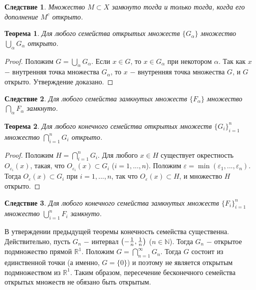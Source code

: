 \documentclass{article}
\newtheorem{theorem}{Теорема}[section]
\newtheorem*{consequence}{Следствие}
\begin{document}
\begin{consequence}
Множество \(M \subset X\) замкнуто тогда и только тогда, когда его дополнение \(M^c\) открыто.
\end{consequence}

\begin{theorem}
Для любого семейства открытых множеств \(\{G_\alpha\}\) множество \(\bigcup\limits_{\alpha}G_\alpha\) открыто.
\end{theorem}

\begin{proof}
Положим \(G = \bigcup\limits_{\alpha}G_\alpha\). Если \(x \in G\), то \(x \in G_\alpha\) при некотором \(\alpha\). Так как \(x\) \(-\) внутренняя точка множества \(G_\alpha\), то \(x\) \(-\) внутренняя точка множества \(G\), и \(G\) открыто. Утверждение доказано.
\end{proof}

\begin{consequence}
Для любого семейства замкнутых множеств \(\{F_\alpha\}\) множество \(\bigcap\limits_{\alpha}F_\alpha\) замкнуто.
\end{consequence}

\begin{theorem}
Для любого конечного семейства открытых множеств \(\{G_i\}_{i=1}^n\) множество \(\bigcap\limits_{i=1}^{n}G_i\) открыто.
\end{theorem}

\begin{proof}
Положим \(H = \bigcap\limits_{i=1}^{n}G_i\). Для любого \(x \in H\) существует окрестность \(O_{\varepsilon_i}(x)\), такая, что \(O_{\varepsilon_i}(x) \subset G_i\) (\(i = 1, ..., n\)). Положим \(\varepsilon = \min(\varepsilon_1, ..., \varepsilon_n)\). Тогда \(O_\varepsilon(x) \subset G_i\) при \(i = 1, ..., n\), так что \(O_\varepsilon(x) \subset H\), и множество \(H\) открыто.
\end{proof}

\begin{consequence}
Для любого конечного семейства замкнутых множеств \(\{F_i\}_{i=1}^n\) множество \(\bigcup\limits_{i=1}^{n}F_i\) замкнуто.
\end{consequence}

В утверждении предыдущей теоремы конечность семейства существенна. Действительно, пусть \(G_n\) \(-\) интервал \(\left(-{1 \over n}, {1 \over n}\right)\) (\(n \in \mathbb{N}\)). Тогда \(G_n\) \(-\) открытое подмножество прямой \(\mathbb{R}^1\). Положим \(G = \bigcap\limits_{n=1}^{\infty}G_n\). Тогда \(G\) состоит из единственной точки (а именно, \(G = \{0\}\)) и поэтому не является открытым подмножеством из \(\mathbb{R}^1\). Таким образом, пересечение бесконечного семейства открытых множеств не обязано быть открытым. \newline
\end{document}
